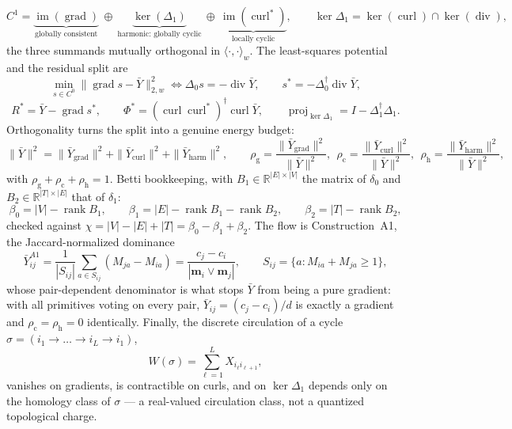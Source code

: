 \documentclass[11pt,a4paper]{article}
\theoremstyle{plain}
\theoremstyle{remark}
\theoremstyle{plain}
\begin{document}
\begin{equation}
C^1=\underbrace{\operatorname{im}(\operatorname{grad})}_{\text{globally consistent}}\ \oplus\ \underbrace{\ker(\Delta_1)}_{\text{harmonic: globally cyclic}}\ \oplus\ \underbrace{\operatorname{im}(\operatorname{curl}^{*})}_{\text{locally cyclic}},
\qquad \ker\Delta_1=\ker(\operatorname{curl})\cap\ker(\operatorname{div}),
\label{eq:helmholtz}
\end{equation}
the three summands mutually orthogonal in $\langle\cdot,\cdot\rangle_w$. The least-squares potential and the residual split are
\begin{equation}
\min_{s\in C^0}\|\operatorname{grad}s-\bar Y\|_{2,w}^2\iff\Delta_0s=-\operatorname{div}\bar Y,\qquad
s^{*}=-\Delta_0^{\dagger}\operatorname{div}\bar Y,
\label{eq:hodgerank}
\end{equation}
\begin{equation}
R^{*}=\bar Y-\operatorname{grad}s^{*},\qquad
\Phi^{*}=(\operatorname{curl}\operatorname{curl}^{*})^{\dagger}\operatorname{curl}\bar Y,\qquad
\operatorname{proj}_{\ker\Delta_1}=I-\Delta_1^{\dagger}\Delta_1 .
\label{eq:residualsplit}
\end{equation}
Orthogonality turns the split into a genuine energy budget:
\begin{equation}
\|\bar Y\|^2=\|\bar Y_{\mathrm{grad}}\|^2+\|\bar Y_{\mathrm{curl}}\|^2+\|\bar Y_{\mathrm{harm}}\|^2,
\qquad
\rho_{\mathrm g}=\frac{\|\bar Y_{\mathrm{grad}}\|^2}{\|\bar Y\|^2},\ \
\rho_{\mathrm c}=\frac{\|\bar Y_{\mathrm{curl}}\|^2}{\|\bar Y\|^2},\ \
\rho_{\mathrm h}=\frac{\|\bar Y_{\mathrm{harm}}\|^2}{\|\bar Y\|^2},
\label{eq:rhos}
\end{equation}
with $\rho_{\mathrm g}+\rho_{\mathrm c}+\rho_{\mathrm h}=1$. Betti bookkeeping, with $B_1\in\mathbb{R}^{|E|\times|V|}$ the matrix of $\delta_0$ and $B_2\in\mathbb{R}^{|T|\times|E|}$ that of $\delta_1$:
\begin{equation}
\beta_0=|V|-\operatorname{rank}B_1,\qquad
\beta_1=|E|-\operatorname{rank}B_1-\operatorname{rank}B_2,\qquad
\beta_2=|T|-\operatorname{rank}B_2,
\label{eq:betti}
\end{equation}
checked against $\chi=|V|-|E|+|T|=\beta_0-\beta_1+\beta_2$. The flow is Construction~A1, the Jaccard-normalized dominance
\begin{equation}
\bar Y^{A1}_{ij}=\frac{1}{|S_{ij}|}\sum_{a\in S_{ij}}(M_{ja}-M_{ia})=\frac{c_j-c_i}{|\mathbf m_i\vee\mathbf m_j|},
\qquad S_{ij}=\{a:M_{ia}+M_{ja}\ge1\},
\label{eq:a1flow}
\end{equation}
whose pair-dependent denominator is what stops $\bar Y$ from being a pure gradient: with all primitives voting on every pair, $\bar Y_{ij}=(c_j-c_i)/d$ is exactly a gradient and $\rho_{\mathrm c}=\rho_{\mathrm h}=0$ identically. Finally, the discrete circulation of a cycle $\sigma=(i_1\to\dots\to i_L\to i_1)$,
\begin{equation}
W(\sigma)=\sum_{\ell=1}^{L}X_{i_\ell i_{\ell+1}},
\label{eq:circulation}
\end{equation}
vanishes on gradients, is contractible on curls, and on $\ker\Delta_1$ depends only on the homology class of $\sigma$ --- a real-valued circulation class, not a quantized topological charge.
\end{document}
